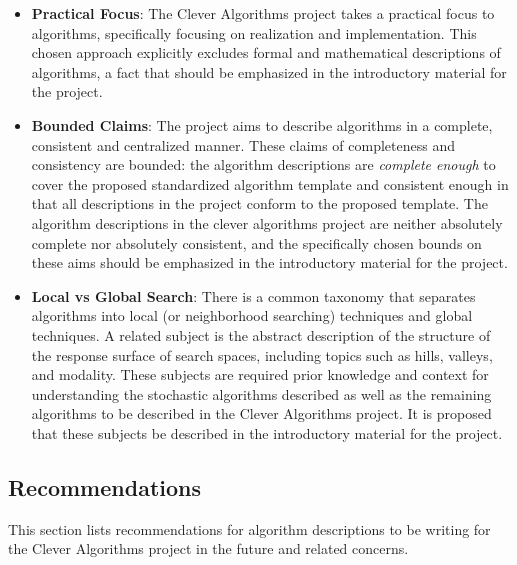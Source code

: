 \documentclass[a4paper, 11pt]{article}
\begin{document}
\begin{itemize}
	\item \textbf{Practical Focus}: The Clever Algorithms project takes a practical focus to algorithms, specifically focusing on realization and implementation. This chosen approach explicitly excludes formal and mathematical descriptions of algorithms, a fact that should be emphasized in the introductory material for the project. 
	\item \textbf{Bounded Claims}: The project aims to describe algorithms in a complete, consistent and centralized manner. These claims of completeness and consistency are bounded: the algorithm descriptions are \emph{complete enough} to cover the proposed standardized algorithm template and consistent enough in that all descriptions in the project conform to the proposed template. The algorithm descriptions in the clever algorithms project are neither absolutely complete nor absolutely consistent, and the specifically chosen bounds on these aims should be emphasized in the introductory material for the project.  
	\item \textbf{Local vs Global Search}: There is a common taxonomy that separates algorithms into local (or neighborhood searching) techniques and global techniques. A related subject is the abstract description of the structure of the response surface of search spaces, including topics such as hills, valleys, and modality. These subjects are required prior knowledge and context for understanding the stochastic algorithms described as well as the remaining algorithms to be described in the Clever Algorithms project. It is proposed that these subjects be described in the introductory material for the project.
\end{itemize}


% 
% 
\subsection{Recommendations}
This section lists recommendations for algorithm descriptions to be writing for the Clever Algorithms project in the future and related concerns. 
\end{document}
